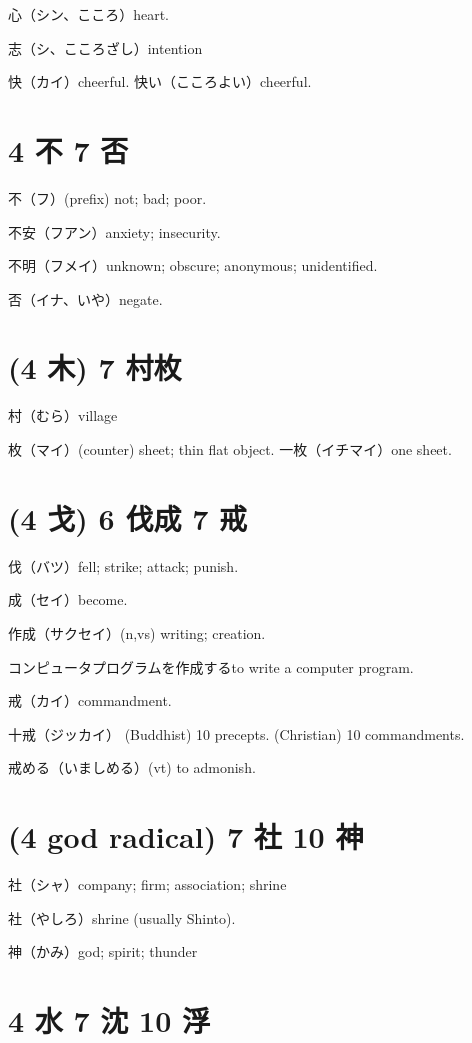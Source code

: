 心（シン、こころ）heart.

志（シ、こころざし）intention

快（カイ）cheerful.
快い（こころよい）cheerful.

\section{4 不 7 否}

不（フ）(prefix) not; bad; poor.

不安（フアン）anxiety; insecurity.

不明（フメイ）unknown; obscure; anonymous; unidentified.

否（イナ、いや）negate.

\section{(4 木) 7 村枚}

村（むら）village

枚（マイ）(counter) sheet; thin flat object.
一枚（イチマイ）one sheet.

\section{(4 戈) 6 伐成 7 戒}

伐（バツ）fell; strike; attack; punish.

成（セイ）become.

作成（サクセイ）(n,vs) writing; creation.

コンピュータプログラムを作成するto write a computer program.

戒（カイ）commandment.

十戒（ジッカイ）
(Buddhist) 10 precepts.
(Christian) 10 commandments.

戒める（いましめる）(vt) to admonish.

\section{(4 god radical) 7 社 10 神}

社（シャ）company; firm; association; shrine

社（やしろ）shrine (usually Shinto).

神（かみ）god; spirit; thunder

\section{4 水 7 沈 10 浮}

